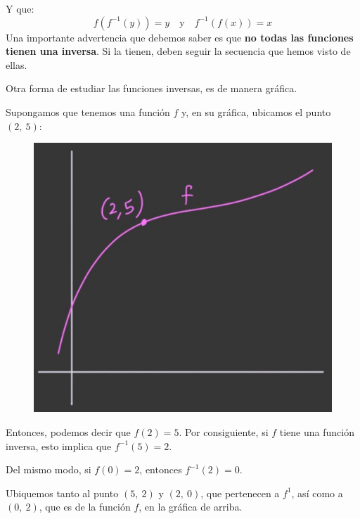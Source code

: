 \documentclass[12pt]{article}
\begin{document}
Y que:
\[f(f^{-1}(y)) = y \quad \text{y} \quad f^{-1}(f(x)) = x\]
Una importante advertencia que debemos saber es que \textbf{no todas las funciones tienen una inversa}. Si la tienen, deben seguir la secuencia que hemos visto de ellas.

Otra forma de estudiar las funciones inversas, es de manera gráfica.

Supongamos que tenemos una función $f$ y, en su gráfica, ubicamos el punto $(2, \ 5)$:

\begin{figure}[hbt!]
\centering
\includegraphics[scale=0.45]{img/inverse-fun.jpg}
\end{figure}

Entonces, podemos decir que $f(2) = 5$. Por consiguiente, si $f$ tiene una función inversa, esto implica que $f^{-1}(5) = 2$.

Del mismo modo, si $f(0) = 2$, entonces $f^{-1}(2) = 0$.

Ubiquemos tanto al punto $(5, \ 2)$ y $(2, \ 0)$, que pertenecen a $f^{1}$, así como a $(0, \ 2)$, que es de la función $f$, en la gráfica de arriba.
\end{document}
